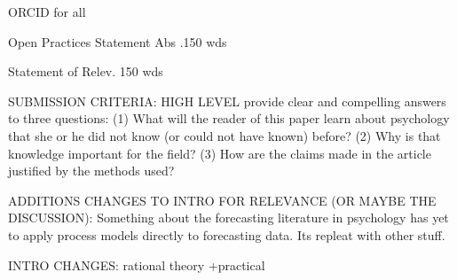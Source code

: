 ORCID for all

Open Practices Statement
Abs .150 wds

Statement of Relev. 150 wds

SUBMISSION CRITERIA: HIGH LEVEL
provide clear and compelling answers to three questions: (1) What will the reader of this paper learn about psychology that she or he did not know (or could not have known) before? (2) Why is that knowledge important for the field? (3) How are the claims made in the article justified by the methods used?


ADDITIONS CHANGES TO INTRO FOR RELEVANCE (OR MAYBE THE DISCUSSION):
Something about the forecasting literature in psychology has yet to apply process models directly to forecasting data. Its repleat with other stuff.

INTRO CHANGES:
rational theory
+practical
